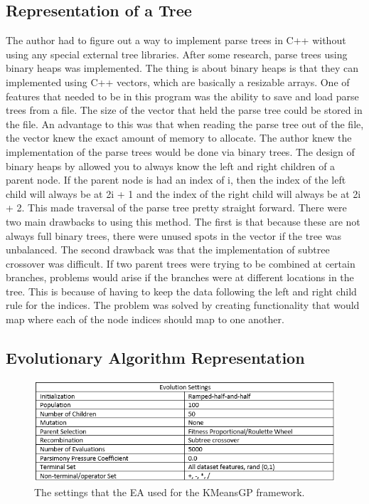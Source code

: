 \documentclass[conference]{IEEEtran}
\begin{document}
\subsection{Representation of a Tree}
The author had to figure out a way to implement parse trees in C++ without using any special external tree libraries.  After some research, parse trees using binary heaps\cite{HodaNima} was implemented.  The thing is about binary heaps is that they can implemented using C++ vectors, which are basically a resizable arrays.  One of features that needed to be in this program was the ability to save and load parse trees from a file.  The size of the vector that held the parse tree could be stored in the file.  An advantage to this was that when reading the parse tree out of the file, the vector knew the exact amount of memory to allocate.  The author knew the implementation of the parse trees would be done via binary trees.  The design of binary heaps by \cite{HodaNima} allowed you to always know the left and right children of a parent node.  If the parent node is had an index of i, then the index of the left child will always be at 2i + 1 and the index of the right child will always be at 2i + 2.  This made traversal of the parse tree pretty straight forward.  There were two main drawbacks to using this method.  The first is that because these are not always full binary trees, there were unused spots in the vector if the tree was unbalanced.  The second drawback was that the implementation of subtree crossover was difficult.  If two parent trees were trying to be combined at certain branches, problems would arise if the branches were at different locations in the tree.  This is because of having to keep the data following the left and right child rule for the indices.  The problem was solved by creating functionality that would map where each of the node indices should map to one another.
\subsection{Evolutionary Algorithm Representation}
\begin{figure}[H]
\begin{center}
\includegraphics[width=0.8\columnwidth]{EASettings.png}
\caption{The settings that the EA used for the KMeansGP framework.}
\end{center}
\label{fig}
\end{figure}
\end{document}

